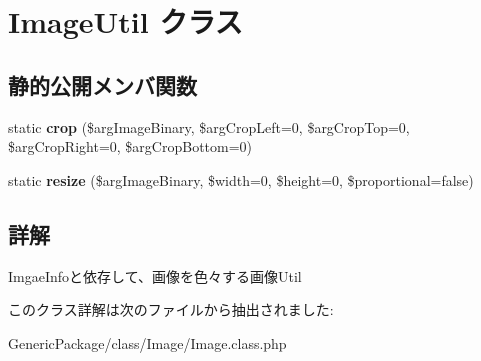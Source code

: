 \hypertarget{class_image_util}{}\section{Image\+Util クラス}
\label{class_image_util}
\subsection*{静的公開メンバ関数}
\begin{DoxyCompactItemize}
\item 
\hypertarget{class_image_util_ad1ddd6ecbd5291ec88d3eba7cea0ac30}{}static {\bfseries crop} (\$arg\+Image\+Binary, \$arg\+Crop\+Left=0, \$arg\+Crop\+Top=0, \$arg\+Crop\+Right=0, \$arg\+Crop\+Bottom=0)\label{class_image_util_ad1ddd6ecbd5291ec88d3eba7cea0ac30}

\item 
\hypertarget{class_image_util_ae3dbf76ea97f32b35fe4842eb4352d96}{}static {\bfseries resize} (\$arg\+Image\+Binary, \$width=0, \$height=0, \$proportional=false)\label{class_image_util_ae3dbf76ea97f32b35fe4842eb4352d96}

\end{DoxyCompactItemize}


\subsection{詳解}
Imgae\+Infoと依存して、画像を色々する画像\+Util 

このクラス詳解は次のファイルから抽出されました\+:\begin{DoxyCompactItemize}
\item 
Generic\+Package/class/\+Image/Image.\+class.\+php\end{DoxyCompactItemize}

